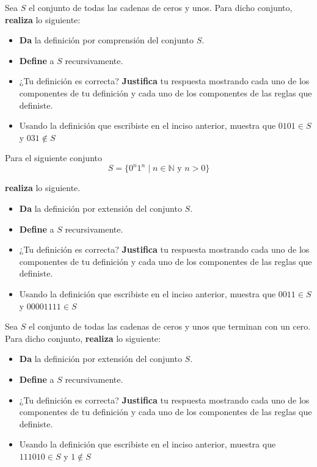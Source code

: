 \documentclass[oneside]{style}
\begin{document}
\begin{questions}[label=\protect\circled{\bfseries\arabic*}]
    \question
    {
        Sea $S$ el conjunto de todas las cadenas de ceros y unos. Para dicho 
        conjunto, \textbf{realiza} lo siguiente:
        \begin{itemize}
            \item \textbf{Da} la definición por comprensión del conjunto $S$.
            \item \textbf{Define} a $S$ recursivamente.
            \item ¿Tu definición es correcta? \textbf{Justifica} tu respuesta 
            mostrando cada uno de los componentes de tu definición y cada uno 
            de los componentes de las reglas que definiste. 
            \item Usando la definición que escribiste en el inciso anterior, 
            muestra que $0101 \in S$ y $031 \not \in S$ 
        \end{itemize}
    }

    \question
    {
        Para el siguiente conjunto 
        \begin{equation*}
            S = \{0^n 1^n \; | \; n \in \mathbb{N} \text{ y } n > 0\}
        \end{equation*}

        \textbf{realiza} lo siguiente.
        \begin{itemize}
            \item \textbf{Da} la definición por extensión del conjunto $S$.
            \item \textbf{Define} a $S$ recursivamente.
            \item ¿Tu definición es correcta? \textbf{Justifica} tu respuesta 
            mostrando cada uno de los componentes de tu definición y cada uno 
            de los componentes de las reglas que definiste. 
            \item Usando la definición que escribiste en el inciso anterior, 
            muestra que $0011 \in S$ y $00001111 \in S$
        \end{itemize}
    }

    \question
    {
        Sea $S$ el conjunto de todas las cadenas de ceros y unos que terminan 
        con un cero. Para dicho conjunto, \textbf{realiza} lo siguiente:
        \begin{itemize}
            \item \textbf{Da} la definición por extensión del conjunto $S$.
            \item \textbf{Define} a $S$ recursivamente.
            \item ¿Tu definición es correcta? \textbf{Justifica} tu respuesta 
            mostrando cada uno de los componentes de tu definición y cada uno 
            de los componentes de las reglas que definiste. 
            \item Usando la definición que escribiste en el inciso anterior, 
            muestra que $111010 \in S$ y $1 \not \in S$ 
        \end{itemize}
    }


\end{questions}
\end{document}
